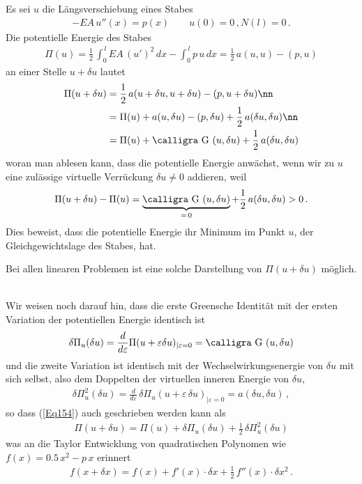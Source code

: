 Es sei $u$ die L\"{a}ngsverschiebung eines Stabes
\begin{align}
- EA\,u''(x) = p(x)  \qquad u(0) = 0\,, N(l) = 0\,.
\end{align}
Die potentielle Energie des Stabes
\begin{align}
\Pi(u) = \frac{1}{2}\,\int_0^{\,l} EA\,(u')^2\,dx - \int_0^{\,l} p\,u\,dx = \frac{1}{2}\, a(u,u) - (p,u)
\end{align}
an einer Stelle $u + \delta u$ lautet
\begin{align} \label{Eq154}
\Pi(u + \delta u) &= \frac{1}{2}\, a(u + \delta u,u + \delta u) - (p,u + \delta u) \nn \\
&= \Pi(u) + a(u, \delta u) - (p, \delta u) + \frac{1}{2}\,a(\delta u, \delta u) \nn \\
&= \Pi(u) + \text{\normalfont\calligra G\,\,}(u, \delta u) + \frac{1}{2}\, a(\delta u, \delta u)
\end{align}
woran man ablesen kann, dass die potentielle Energie anw\"{a}chst, wenn wir zu $u$ eine zul\"{a}ssige virtuelle Verr\"{u}ckung $\delta u \neq 0$ addieren, weil
\begin{align}
\Pi(u + \delta u) - \Pi(u) =  \underbrace{\text{\normalfont\calligra G\,\,}(u, \delta u)}_{= \,0} + \frac{1}{2}\, a(\delta u, \delta u) > 0\,.
\end{align}
Dies beweist, dass die potentielle Energie ihr Minimum im Punkt $u$, der Gleichgewichtslage des Stabes, hat.\\

\hspace*{-12pt}\colorbox{hellgrau}{\parbox{0.98\textwidth}{Bei allen linearen Problemen ist eine solche Darstellung von $\Pi(u + \delta u)$ m\"{o}glich.}}\\

Wir weisen noch darauf hin, dass die erste Greensche Identit\"{a}t mit der ersten Variation der potentiellen Energie identisch ist
\begin{align}
\delta \Pi_u(\delta u) = \frac{d}{d\varepsilon} \Pi(u + \varepsilon \delta u)_{| \varepsilon = 0} = \text{\normalfont\calligra G\,\,}(u, \delta u)
\end{align}
und die zweite Variation ist identisch mit der Wechselwirkungsenergie von $\delta u$ mit sich selbst, also dem Doppelten der virtuellen inneren Energie von $\delta u$,
\begin{align}
\delta \Pi_{u}^2(\delta u) = \frac{d}{d\varepsilon} \,\delta \Pi_u(u + \varepsilon\,\delta u)_{| \varepsilon = 0} = a(\delta u, \delta u)\,,
\end{align}
so dass (\ref{Eq154}) auch geschrieben werden kann als
\begin{align}
\Pi(u + \delta u) = \Pi(u) + \delta \Pi_u(\delta u) + \frac{1}{2}\, \delta \Pi_{u}^2(\delta u)
\end{align}
was an die Taylor Entwicklung von quadratischen Polynomen wie $f(x) = 0.5\,x^2 - p \,x$ erinnert
\begin{align}
f(x + \delta x) = f(x) + f'(x) \cdot \delta x + \frac{1}{2}\,f''(x)\cdot \delta x^2\,.
\end{align}

